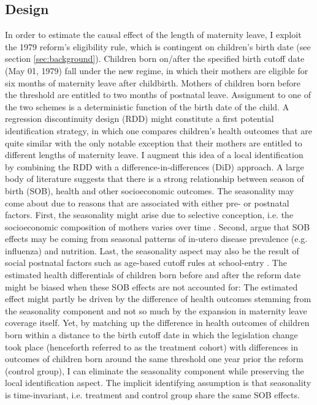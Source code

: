 \documentclass[11pt, a4paper,draft]{article} %
\begin{document}
\subsection{Design}\label{sec:empirical_strategy_1design}
In order to estimate the causal effect of the length of maternity leave, I exploit the 1979 reform's eligibility rule, which is contingent on children's birth date (see section \ref{sec:background}). Children born on/after the specified birth cutoff date (May 01, 1979) fall under the new regime, in which their mothers are eligible for six months of maternity leave after childbirth. Mothers of children born before the threshold are entitled to two months of postnatal leave. Assignment to one of the two schemes is a deterministic function of the birth date of the child. A regression discontinuity design (RDD) might constitute a first potential identification strategy, in which one compares children's health outcomes that are quite similar with the only notable exception that their mothers are entitled to different lengths of maternity leave. I augment this idea of a local identification by combining the RDD with a difference-in-differences (DiD) approach. A large body of literature suggests that there is a strong relationship between season of birth (SOB), health and other socioeconomic outcomes. The seasonality may come about due to reasons that are associated with either pre- or postnatal factors. First, the seasonality might arise due to selective conception, i.e. the socioeconomic composition of mothers varies over time \citep{buckles2013season}. Second, \cite{currie2013within} argue that SOB effects may be coming from seasonal patterns of in-utero disease prevalence (e.g. influenza) and nutrition. Last, the seasonality aspect may also be the result of social postnatal factors such as age-based cutoff rules at school-entry \citep{black2011too}. \newline The estimated health differentials of children born before and after the reform date might be biased when these SOB effects are not accounted for: The estimated effect might partly be driven by the difference of health outcomes stemming from the seasonality component and not so much by the expansion in maternity leave coverage itself. Yet, by matching up the difference in health outcomes of children born within a distance to the birth cutoff date in which the legislation change took place (henceforth referred to as the treatment cohort) with differences in outcomes of children born around the same threshold one year prior the reform (control group), I can eliminate the seasonality component while preserving the local identification aspect. The implicit identifying assumption is that seasonality is time-invariant, i.e. treatment and control group share the same SOB effects.\newline
\end{document}
